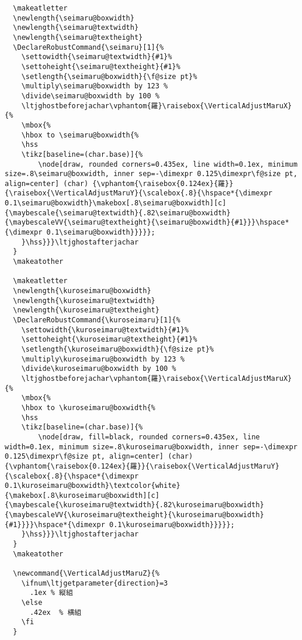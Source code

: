 \documentclass[luatex,fontsize=10pt,paper=b5,twoside]{jlreq}%
\begin{document}
\begin{lstlisting}
  \makeatletter
  \newlength{\seimaru@boxwidth}
  \newlength{\seimaru@textwidth}
  \newlength{\seimaru@textheight}
  \DeclareRobustCommand{\seimaru}[1]{%
    \settowidth{\seimaru@textwidth}{#1}%
    \settoheight{\seimaru@textheight}{#1}%
    \setlength{\seimaru@boxwidth}{\f@size pt}%
    \multiply\seimaru@boxwidth by 123 %
    \divide\seimaru@boxwidth by 100 %
    \ltjghostbeforejachar\vphantom{羅}\raisebox{\VerticalAdjustMaruX}{%
    \mbox{%
    \hbox to \seimaru@boxwidth{%
    \hss
    \tikz[baseline=(char.base)]{%
        \node[draw, rounded corners=0.435ex, line width=0.1ex, minimum size=.8\seimaru@boxwidth, inner sep=-\dimexpr 0.125\dimexpr\f@size pt, align=center] (char) {\vphantom{\raisebox{0.124ex}{羅}}{\raisebox{\VerticalAdjustMaruY}{\scalebox{.8}{\hspace*{\dimexpr 0.1\seimaru@boxwidth}\makebox[.8\seimaru@boxwidth][c]{\maybescale{\seimaru@textwidth}{.82\seimaru@boxwidth}{\maybescaleVV{\seimaru@textheight}{\seimaru@boxwidth}{#1}}}\hspace*{\dimexpr 0.1\seimaru@boxwidth}}}}};
    }\hss}}}\ltjghostafterjachar
  }
  \makeatother

  \makeatletter
  \newlength{\kuroseimaru@boxwidth}
  \newlength{\kuroseimaru@textwidth}
  \newlength{\kuroseimaru@textheight}
  \DeclareRobustCommand{\kuroseimaru}[1]{%
    \settowidth{\kuroseimaru@textwidth}{#1}%
    \settoheight{\kuroseimaru@textheight}{#1}%
    \setlength{\kuroseimaru@boxwidth}{\f@size pt}%
    \multiply\kuroseimaru@boxwidth by 123 %
    \divide\kuroseimaru@boxwidth by 100 %
    \ltjghostbeforejachar\vphantom{羅}\raisebox{\VerticalAdjustMaruX}{%
    \mbox{%
    \hbox to \kuroseimaru@boxwidth{%
    \hss
    \tikz[baseline=(char.base)]{%
        \node[draw, fill=black, rounded corners=0.435ex, line width=0.1ex, minimum size=.8\kuroseimaru@boxwidth, inner sep=-\dimexpr 0.125\dimexpr\f@size pt, align=center] (char) {\vphantom{\raisebox{0.124ex}{羅}}{\raisebox{\VerticalAdjustMaruY}{\scalebox{.8}{\hspace*{\dimexpr 0.1\kuroseimaru@boxwidth}\textcolor{white}{\makebox[.8\kuroseimaru@boxwidth][c]{\maybescale{\kuroseimaru@textwidth}{.82\kuroseimaru@boxwidth}{\maybescaleVV{\kuroseimaru@textheight}{\kuroseimaru@boxwidth}{#1}}}}\hspace*{\dimexpr 0.1\kuroseimaru@boxwidth}}}}};
    }\hss}}}\ltjghostafterjachar
  }
  \makeatother

  \newcommand{\VerticalAdjustMaruZ}{%
    \ifnum\ltjgetparameter{direction}=3
      .1ex % 縦組
    \else
      .42ex  % 横組
    \fi
  }


\end{lstlisting}
\end{document}
